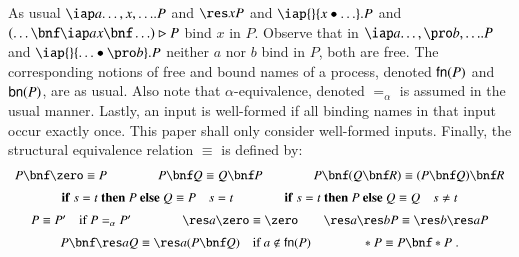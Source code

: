 \documentclass[submission,copyright,creativecommons]{eptcs}
\newcommand{\ifte}[4]{{\bf if}\ #1=#2\ {\bf then}\ #3\ {\bf else}\ #4}
\newcommand{\join}[1]{(#1)\rhd }
\begin{document}
As usual $\iap a {\ldots,x,\ldots}.P$ and $\res x P$ and $\iap {} {x\bullet\ldots} . P$ and $\join {\ldots\bnf\iap a x \bnf \ldots} P$ bind $x$ in $P$.
Observe that in $\iap a {\ldots,\pro b,\ldots} .P$ and $\iap {} {\ldots\bullet\pro b} .P$
neither $a$ nor $b$ bind in $P$, both are free.
The corresponding notions of free and bound names of a process, denoted ${\sf fn}(P)$ and ${\sf bn}(P)$,
are as usual.
Also note that $\alpha$-equivalence, denoted $=_\alpha$ is assumed in the usual manner.
Lastly, an input is well-formed if all binding names in that input occur exactly once. This paper shall only consider well-formed inputs.
Finally, the structural equivalence relation $\equiv$ is defined by: 
\begin{equation*}
\begin{array}{c}
P\bnf \zero \equiv P
\qquad\qquad
P\bnf Q \equiv Q \bnf P
\qquad\qquad
P\bnf (Q\bnf R) \equiv (P\bnf Q)\bnf R
\vspace{0.2cm} \\
\ifte s t P Q \equiv P\quad s = t
\qquad\qquad
\ifte s t P Q \equiv Q\quad s\neq t
\vspace{0.2cm} \\
P\equiv P'\quad\mbox{if}\ P=_\alpha P'
\qquad\qquad
\res a \zero \equiv \zero
\qquad \res a \res b P\equiv \res b \res a P
\vspace{0.2cm} \\
P\bnf \res a Q\equiv \res a (P\bnf Q)\quad \mbox{if}\ a\notin{\sf fn}(P)
\qquad\qquad
*P\equiv P\bnf *P \; .\vspace{-0.4cm}
\end{array}
\end{equation*}
\end{document}
